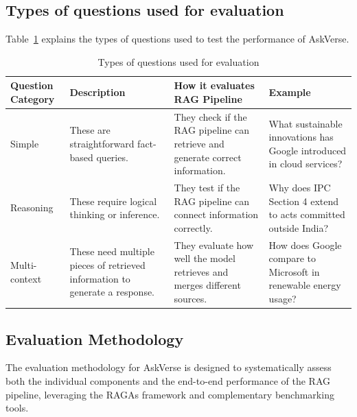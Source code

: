 \documentclass[default]{sn-jnl}%
\begin{document}
\subsection*{Types of questions used for evaluation}
Table~\ref{tab2} explains the types of questions used to test the performance of AskVerse.
\begin{table}[h]
\caption{Types of questions used for evaluation}\label{tab2}%
\renewcommand{\arraystretch}{1.2}
\setlength{\tabcolsep}{4pt}
\begin{tabular}{|p{2cm}|p{3.5cm}|p{3.5cm}|p{3.5cm}|}
\hline
\textbf{Question Category} & \textbf{Description} & \textbf{How it evaluates RAG Pipeline} & \textbf{Example} \\
\hline
Simple & These are straightforward fact-based queries. & They check if the RAG pipeline can retrieve and generate correct information. & What sustainable innovations has Google introduced in cloud services? \\
\hline
Reasoning & These require logical thinking or inference. & They test if the RAG pipeline can connect information correctly. & Why does IPC Section 4 extend to acts committed outside India? \\
\hline
Multi-context & These need multiple pieces of retrieved information to generate a response. & They evaluate how well the model retrieves and merges different sources. & How does Google compare to Microsoft in renewable energy usage? \\
\hline
\end{tabular}
\end{table}

\subsection*{Evaluation Methodology}
The evaluation methodology for AskVerse is designed to systematically assess both the individual components and the end-to-end performance of the RAG pipeline, leveraging the RAGAs framework and complementary benchmarking tools.
\end{document}

